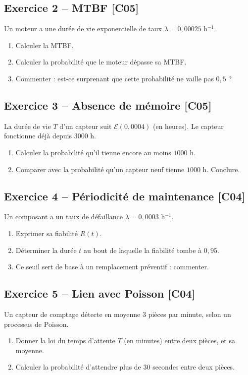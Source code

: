 \documentclass[a4paper,11pt]{article}
\begin{document}
\subsection*{Exercice 2 -- MTBF \hfill {\normalsize\color{uimmred}[C05]}}
Un moteur a une durée de vie exponentielle de taux $\lambda = 0{,}00025$ h$^{-1}$.
\begin{enumerate}[label=\alph*)]
  \item Calculer la MTBF.
  \item Calculer la probabilité que le moteur dépasse sa MTBF.
  \item Commenter : est-ce surprenant que cette probabilité ne vaille pas $0{,}5$ ?
\end{enumerate}

\subsection*{Exercice 3 -- Absence de mémoire \hfill {\normalsize\color{uimmred}[C05]}}
La durée de vie $T$ d'un capteur suit $\mathcal{E}(0{,}0004)$ (en heures). Le capteur fonctionne déjà depuis $3000$ h.
\begin{enumerate}[label=\alph*)]
  \item Calculer la probabilité qu'il tienne encore au moins $1000$ h.
  \item Comparer avec la probabilité qu'un capteur neuf tienne $1000$ h. Conclure.
\end{enumerate}

\subsection*{Exercice 4 -- Périodicité de maintenance \hfill {\normalsize\color{uimmred}[C04]}}
Un composant a un taux de défaillance $\lambda = 0{,}0003$ h$^{-1}$.
\begin{enumerate}[label=\alph*)]
  \item Exprimer sa fiabilité $R(t)$.
  \item Déterminer la durée $t$ au bout de laquelle la fiabilité tombe à $0{,}95$.
  \item Ce seuil sert de base à un remplacement préventif : commenter.
\end{enumerate}

\subsection*{Exercice 5 -- Lien avec Poisson \hfill {\normalsize\color{uimmred}[C04]}}
Un capteur de comptage détecte en moyenne $3$ pièces par minute, selon un processus de Poisson.
\begin{enumerate}[label=\alph*)]
  \item Donner la loi du temps d'attente $T$ (en minutes) entre deux pièces, et sa moyenne.
  \item Calculer la probabilité d'attendre plus de $30$ secondes entre deux pièces.
\end{enumerate}
\end{document}
